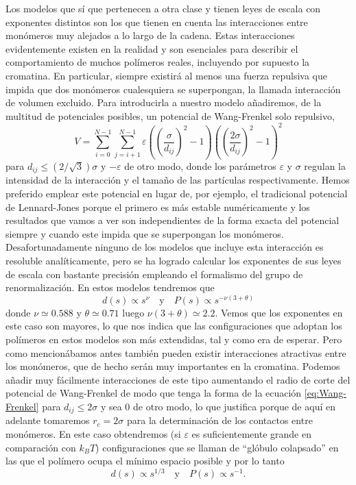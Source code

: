 Los modelos que sí que pertenecen a otra clase y tienen leyes de escala con exponentes distintos son los que tienen en cuenta las interacciones entre monómeros muy alejados a lo largo de la cadena. Estas interacciones evidentemente existen en la realidad y son esenciales para describir el comportamiento de muchos polímeros reales, incluyendo por supuesto la cromatina. En particular, siempre existirá al menos una fuerza repulsiva que impida que dos monómeros cualesquiera se superpongan, la llamada interacción de volumen excluido. Para introducirla a nuestro modelo añadiremos, de la multitud de potenciales posibles, un potencial de Wang-Frenkel \cite{Wang2020} solo repulsivo,
\begin{equation}
    \label{eq:Wang-Frenkel}
    V=\sum_{i=0}^{N-1}\sum_{j=i+1}^{N-1}\varepsilon\left(\left(\frac{\sigma}{d_{ij}}\right)^{2}-1\right)\left(\left(\frac{2\sigma}{d_{ij}}\right)^{2}-1\right)^{2}
\end{equation}
para $d_{ij}\leq\left(2/\sqrt{3}\right)\sigma$ y $-\varepsilon$ de otro modo, donde los parámetros $\varepsilon$ y $\sigma$ regulan la intensidad de la interacción y el tamaño de las partículas respectivamente. Hemos preferido emplear este potencial en lugar de, por ejemplo, el tradicional potencial de Lennard-Jones porque el primero es más estable numéricamente y los resultados que vamos a ver son independientes de la forma exacta del potencial siempre y cuando este impida que se superpongan los monómeros. Desafortunadamente ninguno de los modelos que incluye esta interacción es resoluble analíticamente, pero se ha logrado calcular los exponentes de sus leyes de escala con bastante precisión empleando el formalismo del grupo de renormalización. En estos modelos tendremos que \cite{desCloizeaux1980}
\begin{equation}
    \label{eq:excluded_volume_sd_cp}
    d(s)\propto s^{\nu}  \quad \text{y} \quad P(s)\propto s^{-\nu(3+\theta)}
\end{equation}
donde $\nu\simeq0.588$ y $\theta\simeq0.71$ luego $\nu(3+\theta)\simeq2.2$. Vemos que los exponentes en este caso son mayores, lo que nos indica que las configuraciones que adoptan los polímeros en estos modelos son más extendidas, tal y como era de esperar. Pero como mencionábamos antes también pueden existir interacciones atractivas entre los monómeros, que de hecho serán muy importantes en la cromatina. Podemos añadir muy fácilmente interacciones de este tipo aumentando el radio de corte del potencial de Wang-Frenkel de modo que tenga la forma de la ecuación \ref{eq:Wang-Frenkel} para $d_{ij}\leq2\sigma$ y sea $0$ de otro modo, lo que justifica porque de aquí en adelante tomaremos $r_c=2\sigma$ para la determinación de los contactos entre monómeros. En este caso obtendremos (si $\varepsilon$ es suficientemente grande en comparación con $k_BT$) configuraciones que se llaman de ``glóbulo colapsado'' en las que el polímero ocupa el mínimo espacio posible y por lo tanto
\begin{equation}
    \label{eq:collapsed_globule_sd_cp}
    d(s)\propto s^{1/3}  \quad \text{y} \quad P(s)\propto s^{-1}.
\end{equation}
